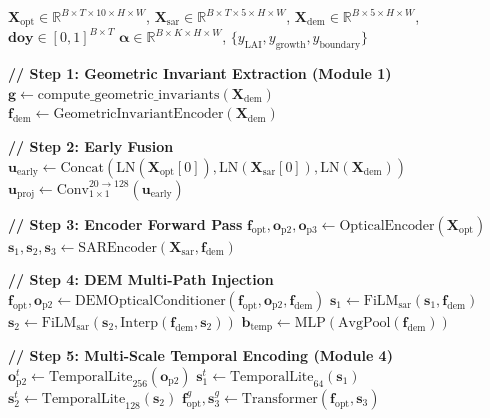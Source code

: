 \begin{algorithm}[h]
\caption{FusionCropNet V6 Forward Propagation}
\label{alg:forward}
\begin{algorithmic}[1]
\Require $\mathbf{X}_{\text{opt}} \in \mathbb{R}^{B \times T \times 10 \times H \times W}$,
         $\mathbf{X}_{\text{sar}} \in \mathbb{R}^{B \times T \times 5 \times H \times W}$,
         $\mathbf{X}_{\text{dem}} \in \mathbb{R}^{B \times 5 \times H \times W}$,
         $\mathbf{doy} \in [0,1]^{B \times T}$
\Ensure $\boldsymbol{\alpha} \in \mathbb{R}^{B \times K \times H \times W}$,
        $\{y_{\text{LAI}}, y_{\text{growth}}, y_{\text{boundary}}\}$

\State \textbf{// Step 1: Geometric Invariant Extraction (Module 1)}
\State $\mathbf{g} \gets \text{compute\_geometric\_invariants}(\mathbf{X}_{\text{dem}})$
\State $\mathbf{f}_{\text{dem}} \gets \text{GeometricInvariantEncoder}(\mathbf{X}_{\text{dem}})$

\State \textbf{// Step 2: Early Fusion}
\State $\mathbf{u}_{\text{early}} \gets \text{Concat}(\text{LN}(\mathbf{X}_{\text{opt}}[0]),
\text{LN}(\mathbf{X}_{\text{sar}}[0]), \text{LN}(\mathbf{X}_{\text{dem}}))$
\State $\mathbf{u}_{\text{proj}} \gets \text{Conv}_{1\times1}^{20 \to 128}(\mathbf{u}_{\text{early}})$

\State \textbf{// Step 3: Encoder Forward Pass}
\State $\mathbf{f}_{\text{opt}}, \mathbf{o}_{\text{p2}}, \mathbf{o}_{\text{p3}} \gets
\text{OpticalEncoder}(\mathbf{X}_{\text{opt}})$ 
\State $\mathbf{s}_1, \mathbf{s}_2, \mathbf{s}_3 \gets
\text{SAREncoder}(\mathbf{X}_{\text{sar}}, \mathbf{f}_{\text{dem}})$

\State \textbf{// Step 4: DEM Multi-Path Injection}
\State $\mathbf{f}_{\text{opt}}, \mathbf{o}_{\text{p2}} \gets
\text{DEMOpticalConditioner}(\mathbf{f}_{\text{opt}}, \mathbf{o}_{\text{p2}}, \mathbf{f}_{\text{dem}})$
\State $\mathbf{s}_1 \gets \text{FiLM}_{\text{sar}}(\mathbf{s}_1, \mathbf{f}_{\text{dem}})$
\State $\mathbf{s}_2 \gets \text{FiLM}_{\text{sar}}(\mathbf{s}_2,
\text{Interp}(\mathbf{f}_{\text{dem}}, \mathbf{s}_2))$
\State $\mathbf{b}_{\text{temp}} \gets \text{MLP}(\text{AvgPool}(\mathbf{f}_{\text{dem}}))$

\State \textbf{// Step 5: Multi-Scale Temporal Encoding (Module 4)}
\State $\mathbf{o}_{\text{p2}}^t \gets \text{TemporalLite}_{256}(\mathbf{o}_{\text{p2}})$
\State $\mathbf{s}_1^t \gets \text{TemporalLite}_{64}(\mathbf{s}_1)$
\State $\mathbf{s}_2^t \gets \text{TemporalLite}_{128}(\mathbf{s}_2)$
\State $\mathbf{f}_{\text{opt}}^g, \mathbf{s}_3^g \gets
\text{Transformer}(\mathbf{f}_{\text{opt}}, \mathbf{s}_3)$


\end{algorithmic}
\end{algorithm}
